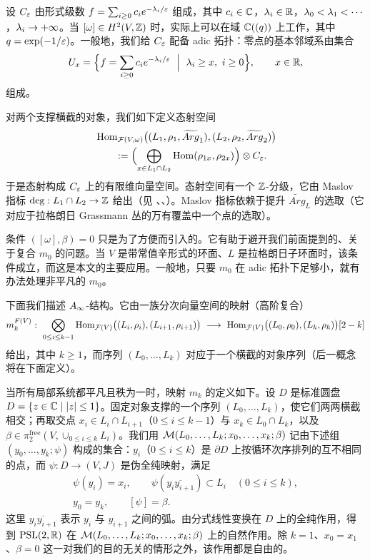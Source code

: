 设 $C_{\varepsilon}$ 由形式级数 $f=\sum_{i\ge0}c_ie^{-\lambda_i/\varepsilon}$ 组成，其中 $c_i\in\mathbb{C}$，$\lambda_i\in\mathbb{R}$，$\lambda_0<\lambda_1<\cdots$，$\lambda_i\to+\infty$。当 $[\omega]\in H^2(V,\mathbb{Z})$ 时，实际上可以在域 $\mathbb{C}((q))$ 上工作，其中 $q=\exp(-1/\varepsilon)$。一般地，我们给 $C_{\varepsilon}$ 配备 adic 拓扑：零点的基本邻域系由集合
\[
  U_x=\Bigl\{f=\sum_{i\ge0}c_ie^{-\lam_i/\eps}\ \Bigm|\ \lam_i\ge x,\ i\ge 0\Bigr\},\qquad x\in\R,
\]
组成。

\begin{dfn}
对两个支撑横截的对象，我们如下定义态射空间
\[
  \begin{aligned}
  &\operatorname{Hom}_{\mathcal{F}(V,\omega)}\bigl((L_1,\rho_1,\widetilde{Arg}_1),(L_2,\rho_2,\widetilde{Arg}_2)\bigr)\\
  &\qquad:=\Bigl(\bigoplus_{x\in L_1\cap L_2}\operatorname{Hom}(\rho_{1x},\rho_{2x})\Bigr)\otimes C_{\varepsilon} .
  \end{aligned}
\]
于是态射构成 $C_{\varepsilon}$ 上的有限维向量空间。态射空间有一个 $\mathbb{Z}$-分级，它由 Maslov 指标 $\deg:L_1\cap L_2\to\mathbb{Z}$ 给出（见 \cite{Fu2}、\cite{Ko}、\cite{Se}）。Maslov 指标依赖于提升 $\widetilde{Arg}_L$ 的选取（它对应于拉格朗日 Grassmann 丛的万有覆盖中一个点的选取）。
\end{dfn}

\begin{rmk}
条件 $([\omega],\beta)=0$ 只是为了方便而引入的。它有助于避开我们前面提到的、关于复合 $m_0$ 的问题。当 $V$ 是带常值辛形式的环面、$L$ 是拉格朗日子环面时，该条件成立，而这是本文的主要应用。一般地，只要 $m_0$ 在 adic 拓扑下足够小，就有办法处理非平凡的 $m_0$。
\end{rmk}

下面我们描述 $A_{\infty}$-结构。它由一族分次向量空间的映射（高阶复合）
\[
  m_k^{F(V)}:\ \bigotimes_{0\le i\le k-1}\Hom_{\F(V)}\bigl((L_i,\rho_i),(L_{i+1},\rho_{i+1})\bigr)
  \ \longrightarrow\ \Hom_{\F(V)}\bigl((L_0,\rho_0),(L_k,\rho_k)\bigr)[2-k]
\]
给出，其中 $k\ge1$，而序列 $(L_0,\dots,L_k)$ 对应于一个横截的对象序列（后一概念将在下面定义）。

当所有局部系统都平凡且秩为一时，映射 $m_k$ 的定义如下。设 $D$ 是标准圆盘 $D=\{z\in\mathbb{C}\mid |z|\le1\}$。固定对象支撑的一个序列 $(L_0,\dots,L_k)$，使它们两两横截相交；再取交点 $x_i\in L_i\cap L_{i+1}$（$0\le i\le k-1$）与 $x_k\in L_0\cap L_k$，以及 $\beta\in\pi_2^{\mathrm{free}}(V,\cup_{0\le i\le k}L_i)$。我们用 $\mathcal{M}(L_0,\dots,L_k;x_0,\dots,x_k;\beta)$ 记由下述组 $(y_0,\dots,y_k;\psi)$ 构成的集合：$y_i$（$0\le i\le k$）是 $\partial D$ 上按循环次序排列的互不相同的点，而 $\psi:D\to(V,J)$ 是伪全纯映射，满足
\[
  \begin{gathered}
  \psi(y_i)=x_i,\qquad \psi(\overline{y_iy_{i+1}})\subset L_i\quad (0\le i\le k),\\
  y_0=y_k,\qquad [\psi]=\beta .
  \end{gathered}
\]
这里 $\overline{y_iy_{i+1}}$ 表示 $y_i$ 与 $y_{i+1}$ 之间的弧。由分式线性变换在 $D$ 上的全纯作用，得到 $\mathrm{PSL}(2,\mathbb{R})$ 在 $\mathcal{M}(L_0,\dots,L_k;\allowbreak x_0,\dots,x_k;\beta)$ 上的自然作用。除 $k=1$、$x_0=x_1$、$\beta=0$ 这一对我们的目的无关的情形之外，该作用都是自由的。

